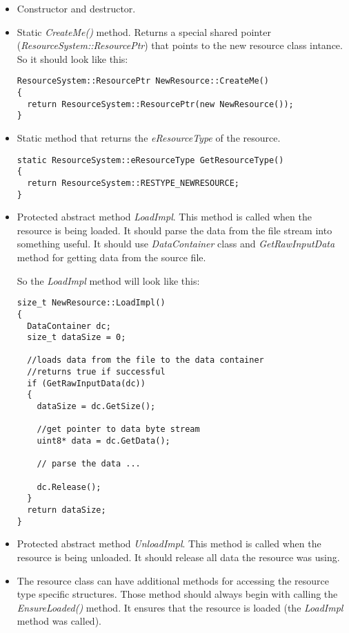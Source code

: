 \documentclass[a4paper, 12pt]{report}
\begin{document}
\begin{itemize}
\item
Constructor and destructor.
\item
Static \emph{CreateMe()} method. Returns a special shared pointer (\emph{ResourceSystem::ResourcePtr}) that points to the new resource class intance. So it should look like this:

\footnotesize 
\begin{verbatim}
ResourceSystem::ResourcePtr NewResource::CreateMe()
{
  return ResourceSystem::ResourcePtr(new NewResource());
}
\end{verbatim}
\normalsize

\item
Static method that returns the \emph{eResourceType} of the resource.

\footnotesize 
\begin{verbatim}
static ResourceSystem::eResourceType GetResourceType() 
{ 
  return ResourceSystem::RESTYPE_NEWRESOURCE; 
}
\end{verbatim}
\normalsize

\item
Protected abstract method \emph{LoadImpl}. This method is called when the resource is being loaded. It should parse the data from the file stream into something useful. It should use \emph{DataContainer} class and \emph{GetRawInputData} method for getting data from the source file.

So the \emph{LoadImpl} method will look like this:

\footnotesize 
\begin{verbatim}
size_t NewResource::LoadImpl()
{
  DataContainer dc;
  size_t dataSize = 0;

  //loads data from the file to the data container
  //returns true if successful
  if (GetRawInputData(dc))	
  {
    dataSize = dc.GetSize();

    //get pointer to data byte stream
    uint8* data = dc.GetData();

    // parse the data ...

    dc.Release();
  }
  return dataSize;
}
\end{verbatim}
\normalsize

\item
Protected abstract method \emph{UnloadImpl}. This method is called when the resource is being unloaded. It should release all data the resource was using.

\item
The resource class can have additional methods for accessing the resource type specific structures. Those method should always begin with calling the \emph{EnsureLoaded()} method. It ensures that the resource is loaded (the \emph{LoadImpl} method was called).

\end{itemize}
\end{document}
